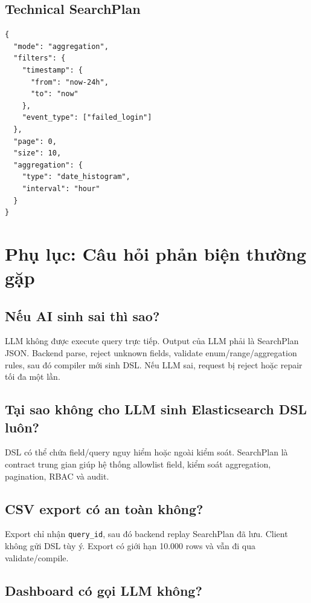 \documentclass[12pt,a4paper]{report}
\begin{document}
\section{Technical SearchPlan}

\begin{lstlisting}[caption={Request POST /api/v1/search/plan cho aggregation}]
{
  "mode": "aggregation",
  "filters": {
    "timestamp": {
      "from": "now-24h",
      "to": "now"
    },
    "event_type": ["failed_login"]
  },
  "page": 0,
  "size": 10,
  "aggregation": {
    "type": "date_histogram",
    "interval": "hour"
  }
}
\end{lstlisting}

\chapter{Phụ lục: Câu hỏi phản biện thường gặp}

\section{Nếu AI sinh sai thì sao?}

LLM không được execute query trực tiếp. Output của LLM phải là SearchPlan JSON. Backend parse, reject unknown fields, validate enum/range/aggregation rules, sau đó compiler mới sinh DSL. Nếu LLM sai, request bị reject hoặc repair tối đa một lần.

\section{Tại sao không cho LLM sinh Elasticsearch DSL luôn?}

DSL có thể chứa field/query nguy hiểm hoặc ngoài kiểm soát. SearchPlan là contract trung gian giúp hệ thống allowlist field, kiểm soát aggregation, pagination, RBAC và audit.

\section{CSV export có an toàn không?}

Export chỉ nhận \texttt{query\_id}, sau đó backend replay SearchPlan đã lưu. Client không gửi DSL tùy ý. Export có giới hạn 10.000 rows và vẫn đi qua validate/compile.

\section{Dashboard có gọi LLM không?}
\end{document}
